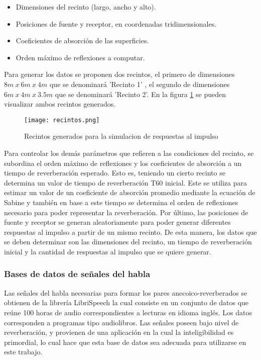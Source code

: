 \begin{itemize}
\item Dimensiones del recinto (largo, ancho y alto).
\item Posiciones de fuente y receptor, en coordenadas tridimensionales.
\item Coeficientes de absorción de las superficies.
\item Orden máximo de reflexiones a computar.
\end{itemize} 

Para generar los datos se proponen dos recintos, el primero de dimensiones $8m\: x\: 6m\: x\: 4m$ que se denominará 'Recinto 1' , el segundo de dimensiones $6m\: x\: 4m\: x\: 3.5m$ que se denominará 'Recinto 2'. En la figura \ref{fig:recintos} se pueden visualizar ambos recintos generados. 

\begin{figure}[H]
	\centering{}
	\texttt{[image: recintos.png]}
	\caption{Recintos generados para la simulacion de respuestas al impulso}
	\label{fig:recintos}
\end{figure}

Para controlar los demás parámetros que refieren a las condiciones del recinto, se subordina el orden máximo de reflexiones y los coeficientes de absorción a un tiempo de reverberación esperado. Esto es, teniendo un cierto recinto se determina un valor de tiempo de reverberación T60 inicial. Este se utiliza para estimar un valor de un coeficiente de absorción promedio mediante la ecuación de Sabine y también en base a este tiempo se determina el orden de reflexiones necesario para poder representar la reverberación. 
Por último, las posiciones de fuente y receptor se generan aleatoriamente para poder generar diferentes respuestas al impulso a partir de un mismo recinto. De esta manera, los datos que se deben determinar son las dimensiones del recinto, un tiempo de reverberación inicial y la cantidad de respuestas al impulso que se quiere generar. 


\subsubsection{Bases de datos de señales del habla}

Las señales del habla necesarias para formar los pares anecoico-reverberados se obtienen de la librería LibriSpeech \cite{librispeech} la cual consiste en un conjunto de datos que reúne 100 horas de audio correspondientes a lecturas en idioma inglés. Los datos corresponden a programas tipo audiolibros. Las señales poseen bajo nivel de reverberación, y provienen de una aplicación en la cual la inteligibilidad es primordial, lo cual hace que esta base de datos sea adecuada para utilizarse en este trabajo.

